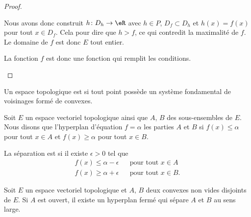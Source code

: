 \begin{proof}
\begin{subproof}
        Nous avons donc construit \( h\colon D_h\to \eR\) avec \( h\in P\), \( D_f\subset D_h\) et \( h(x)=f(x)\) pour tout \( x\in D_f\). Cela pour dire que \( h>f\), ce qui contredit la maximalité de \( f\). Le domaine de \( f\) est donc \( E\) tout entier.

        La fonction \( f\) est donc une fonction qui remplit les conditions.

    \end{subproof}
\end{proof}

\begin{definition}  \label{DefPJokvAa}
    Un espace topologique est  si tout point possède un système fondamental de voisinages formé de convexes.
\end{definition}

\begin{definition}
    Soit \( E\) un espace vectoriel topologique ainsi que \( A\), \( B\) des sous-ensembles de \( E\). Nous disons que l'hyperplan d'équation \( f=\alpha\)  les parties \( A\) et \( B\) si \( f(x)\leq \alpha\) pour tout \( x\in A\) et \( f(x)\geq \alpha\) pour tout \( x\in B\).

    La séparation est  si il existe \( \epsilon>0\) tel que
    \begin{subequations}
        \begin{align}
            f(x)\leq \alpha-\epsilon &  & \text{pour tout } x\in A  \\
            f(x)\geq \alpha+\epsilon &  & \text{pour tout } x\in B.
        \end{align}
    \end{subequations}
\end{definition}

\begin{theorem}  \label{ThoSAJjdZc}
    Soit \( E\) un espace vectoriel topologique et \( A\), \( B\) deux convexes non vides disjoints de \( E\). Si \( A\) est ouvert, il existe un hyperplan fermé qui sépare \( A\) et \( B\) au sens large.
\end{theorem}

